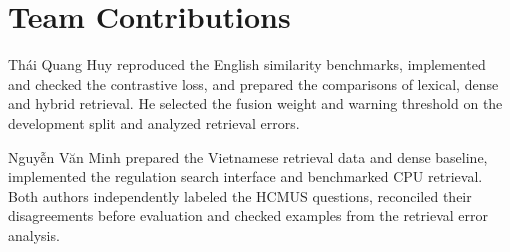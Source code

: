 \section*{Team Contributions}
Thái Quang Huy reproduced the English similarity benchmarks, implemented
and checked the contrastive loss, and prepared the comparisons of lexical,
dense and hybrid retrieval. He selected the fusion weight and warning
threshold on the development split and analyzed retrieval errors.

Nguyễn Văn Minh prepared the Vietnamese retrieval data and dense
baseline, implemented the regulation search interface and benchmarked
CPU retrieval. Both authors independently labeled the HCMUS questions,
reconciled their disagreements before evaluation and checked examples
from the retrieval error analysis.
